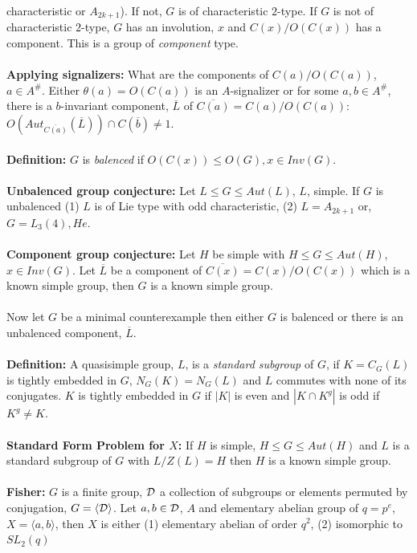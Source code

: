 characteristic or $A_{2k+1}$).  If not, $G$ is of characteristic $2$-type.  If $G$ is not of characteristic $2$-type, $G$
has an involution, $x$ and $C(x)/O(C(x))$ has a component.  This is a group of \emph{component} type.
\\
\\
{\bf Applying signalizers:}  What are the components of $C(a)/O(C(a))$, $a \in A^{\#}$.  Either $\theta(a)=O(C(a))$ is
an $A$-signalizer or for some $a,b \in A^{\#}$, there is a $b$-invariant component, ${\overline L}$ of
${\overline {C(a)}}= C(a)/O(C(a))$: $O(Aut_{\overline {C(a)}}({\overline L})) \cap C({\overline b}) \ne 1$.
\\
\\
{\bf Definition:} $G$ is \emph{balenced} if $O(C(x)) \leq O(G), x \in Inv(G)$.\\
\\
{\bf Unbalenced group conjecture:} Let $L \leq G \leq Aut(L)$, $L$, simple.   If $G$ is unbalenced
(1) $L$ is of Lie type with odd characteristic, (2) $L=A_{2k+1}$ or, $G=L_3(4), He$.
\\
\\
{\bf Component group conjecture:} Let $H$ be simple with $H \leq G \leq Aut(H)$, $x \in Inv(G)$.  Let ${\overline L}$
be a component of ${\overline {C(x)}} = C(x)/O(C(x))$ which is a known simple group, then $G$ is a known simple group.\\
\\
Now let $G$ be a minimal counterexample then either $G$ is balenced or there is an unbalenced component, ${\overline L}$.
\\
\\
{\bf Definition:} A quasisimple group, $L$, is a \emph{standard subgroup} of $G$, if $K=C_G(L)$ is
tightly embedded in $G$, $N_G(K)=N_G(L)$ and $L$ commutes with none of its conjugates.
$K$ is tightly embedded in $G$ if $|K|$ is even and $|K \cap K^g|$ is odd if $K^g \ne K$.
\\
\\
{\bf Standard Form Problem for $X$:}  If $H$ is simple, $H \leq G \leq Aut(H)$ and $L$ is a standard subgroup of $G$
with $L/Z(L) = H$ then $H$ is a known simple group.
\\
\\
{\bf Fisher:} $G$ is a finite group, ${\cal D}$ a collection of subgroups or elements permuted by conjugation, 
$G = \langle {\cal D} \rangle$.  Let $a,b \in {\cal D}$, $A$ and elementary abelian group of $q=p^e$,
$X= \langle a, b \rangle$, then $X$ is either (1) elementary abelian of order $q^2$, (2) isomorphic to $SL_2(q)$

